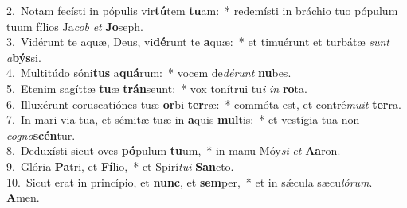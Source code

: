 {2.~}Notam fecísti in pópulis vir\textbf{tú}tem \textbf{tu}am:~* redemísti in bráchio tuo pópulum tuum fílios Ja\textit{cob} \textit{et} \textbf{Jo}seph.\\
{3.~}Vidérunt te aquæ, Deus, vi\textbf{dé}runt te \textbf{a}quæ:~* et timuérunt et turbátæ \textit{sunt} \textit{a}\textbf{býs}si.\\
{4.~}Multitúdo sóni\textbf{tus} a\textbf{quá}rum:~* vocem de\textit{dé}\textit{runt} \textbf{nu}bes.\\
{5.~}Etenim sagíttæ \textbf{tu}æ \textbf{trán}seunt:~* vox tonítrui tu\textit{i} \textit{in} \textbf{ro}ta.\\
{6.~}Illuxérunt coruscatiónes tuæ \textbf{or}bi \textbf{ter}ræ:~* commóta est, et contré\textit{mu}\textit{it} \textbf{ter}ra.\\
{7.~}In mari via tua, et sémitæ tuæ in \textbf{a}quis \textbf{mul}tis:~* et vestígia tua non \textit{co}\textit{gno}\textbf{scén}tur.\\
{8.~}Deduxísti sicut oves \textbf{pó}pulum \textbf{tu}um,~* in manu Móy\textit{si} \textit{et} \textbf{A}\textbf{a}ron.\\
{9.~}Glória \textbf{Pa}tri, et \textbf{Fí}lio,~* et Spirí\textit{tu}\textit{i} \textbf{San}cto.\\
{10.~}Sicut erat in princípio, et \textbf{nunc}, et \textbf{sem}per,~* et in sǽcula sæcu\textit{ló}\textit{rum}. \textbf{A}men.\\
